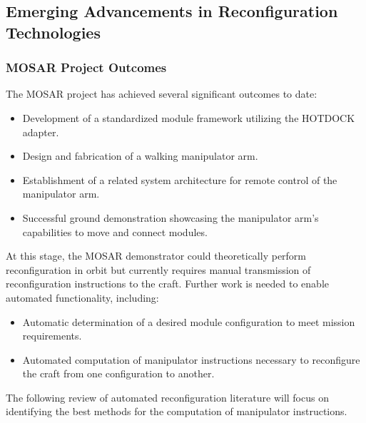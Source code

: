\subsection{Emerging Advancements in Reconfiguration Technologies}
\subsubsection{MOSAR Project Outcomes}
The MOSAR project has achieved several significant outcomes to date:
\begin{itemize}[]
	\item Development of a standardized module framework utilizing the HOTDOCK adapter.
	\item Design and fabrication of a walking manipulator arm.
	\item Establishment of a related system architecture for remote control of the manipulator arm.
	\item Successful ground demonstration showcasing the manipulator arm's capabilities to move and connect modules.
	
\end{itemize}
At this stage, the MOSAR demonstrator could theoretically perform reconfiguration in orbit but currently requires manual transmission of reconfiguration instructions to the craft. Further work is needed to enable automated functionality, including:
\begin{itemize}[]
	\item Automatic determination of a desired module configuration to meet mission requirements.
	\item Automated computation of manipulator instructions necessary to reconfigure the craft from one configuration to another.
	
\end{itemize}
The following review of automated reconfiguration literature will focus on identifying the best methods for the computation of manipulator instructions.

